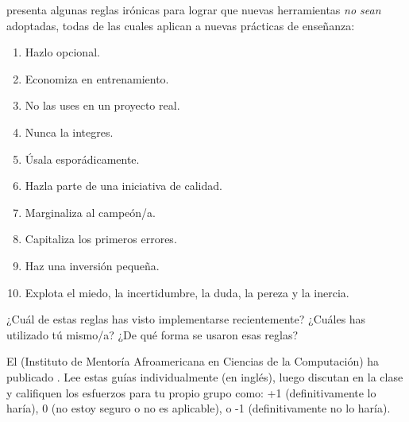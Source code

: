 \cite{Farm2006} presenta algunas reglas irónicas para lograr que nuevas herramientas \emph{no sean} adoptadas,
todas de las cuales aplican a nuevas prácticas de enseñanza:

\begin{enumerate}

\item
  Hazlo opcional.

\item
Economiza en entrenamiento. 

\item
  No las uses en un proyecto real.

\item
  Nunca la integres.

\item
Úsala esporádicamente.

\item
  Hazla parte de una iniciativa de calidad.

\item
  Marginaliza al campeón/a.

\item
Capitaliza los primeros errores.

\item
Haz una inversión pequeña.

\item
 Explota el miedo, la incertidumbre, la duda, la pereza y la inercia.

\end{enumerate}
¿Cuál de estas reglas has visto implementarse recientemente?
¿Cuáles has utilizado tú mismo/a?
¿De qué forma se usaron esas reglas?


El  
(Instituto de Mentoría Afroamericana en Ciencias de la Computación)
ha publicado .
Lee estas guías individualmente (en inglés),
luego discutan en la clase
y califiquen los esfuerzos para tu propio grupo como: +1 (definitivamente lo haría),
0 (no estoy seguro o no es aplicable),
o -1 (definitivamente no lo haría).

